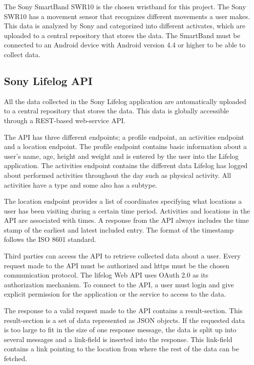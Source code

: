 \documentclass{cslthse-msc}
\begin{document}
The Sony SmartBand SWR10 is the chosen wristband for this project. The Sony SWR10 has a movement sensor that recognizes different movements a user makes\cite{SWR10}. This data is analyzed by Sony and categorized into different activates, which are uploaded to a central repository that stores the data. The SmartBand must be connected to an Android device with Android version 4.4 or higher to be able to collect data.

\subsection{Sony Lifelog API} 
All the data collected in the Sony Lifelog application are automatically uploaded to a central repository that stores the data. This data is globally accessible through a REST-based web-service API\cite{LifeLogDescr}. 

The API has three different endpoints; a profile endpoint, an activities endpoint and a location endpoint. The profile endpoint contains basic information about a user's name, age, height and weight and is entered by the user into the Lifelog application. The activities endpoint contains the different data Lifelog has logged about performed activities throughout the day such as physical activity. All activities have a type and some also has a subtype. 

The location endpoint provides a list of coordinates specifying what locations a user has been visiting during a certain time period. Activities and locations in the API are associated with times. A response from the API always includes the time stamp of the earliest and latest included entry. The format of the timestamp follows the ISO 8601 standard. 

Third parties can access the API to retrieve collected data about a user. Every request made to the API must be authorized and https must be the chosen communication protocol. The lifelog Web API uses OAuth 2.0 as its authorization mechanism. To connect to the API, a user must login and give explicit permission for the application or the service to access to the data. 

The response to a valid request made to the API contains a result-section. This result-section is a set of data represented as JSON objects. If the requested data is too large to fit in the size of one response message, the data is split up into several messages and a link-field is inserted into the response. This link-field contains a link pointing to the location from where the rest of the data can be fetched. 
\end{document}
